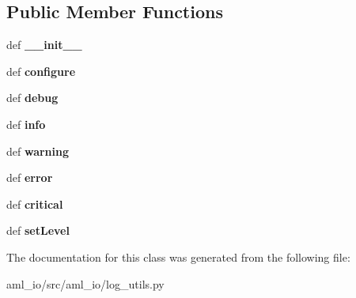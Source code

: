\subsection*{Public Member Functions}
\begin{DoxyCompactItemize}
\item 
\hypertarget{classaml__io_1_1log__utils_1_1_a_m_l_logger_a1ec40701e49f8d447b19b3d45d10f045}{def {\bfseries \-\_\-\-\_\-init\-\_\-\-\_\-}}\label{classaml__io_1_1log__utils_1_1_a_m_l_logger_a1ec40701e49f8d447b19b3d45d10f045}

\item 
\hypertarget{classaml__io_1_1log__utils_1_1_a_m_l_logger_a47091e94ed3a35a5e2f62939e23aab6f}{def {\bfseries configure}}\label{classaml__io_1_1log__utils_1_1_a_m_l_logger_a47091e94ed3a35a5e2f62939e23aab6f}

\item 
\hypertarget{classaml__io_1_1log__utils_1_1_a_m_l_logger_a88f582960993542d9ad0cca62414e15f}{def {\bfseries debug}}\label{classaml__io_1_1log__utils_1_1_a_m_l_logger_a88f582960993542d9ad0cca62414e15f}

\item 
\hypertarget{classaml__io_1_1log__utils_1_1_a_m_l_logger_a8fc3a6e40a5bcad0497e8429c98c2c20}{def {\bfseries info}}\label{classaml__io_1_1log__utils_1_1_a_m_l_logger_a8fc3a6e40a5bcad0497e8429c98c2c20}

\item 
\hypertarget{classaml__io_1_1log__utils_1_1_a_m_l_logger_a79ee644e35fdd1adfa6f50f3075e6ce4}{def {\bfseries warning}}\label{classaml__io_1_1log__utils_1_1_a_m_l_logger_a79ee644e35fdd1adfa6f50f3075e6ce4}

\item 
\hypertarget{classaml__io_1_1log__utils_1_1_a_m_l_logger_a9c9b6b7366eee6c4b03668a86ad632cf}{def {\bfseries error}}\label{classaml__io_1_1log__utils_1_1_a_m_l_logger_a9c9b6b7366eee6c4b03668a86ad632cf}

\item 
\hypertarget{classaml__io_1_1log__utils_1_1_a_m_l_logger_a7232c322b92c64ff9e705c2968e58b83}{def {\bfseries critical}}\label{classaml__io_1_1log__utils_1_1_a_m_l_logger_a7232c322b92c64ff9e705c2968e58b83}

\item 
\hypertarget{classaml__io_1_1log__utils_1_1_a_m_l_logger_a20b130129b2907e6ac9d87aa466dff9d}{def {\bfseries set\-Level}}\label{classaml__io_1_1log__utils_1_1_a_m_l_logger_a20b130129b2907e6ac9d87aa466dff9d}

\end{DoxyCompactItemize}


The documentation for this class was generated from the following file\-:\begin{DoxyCompactItemize}
\item 
aml\-\_\-io/src/aml\-\_\-io/log\-\_\-utils.\-py\end{DoxyCompactItemize}
